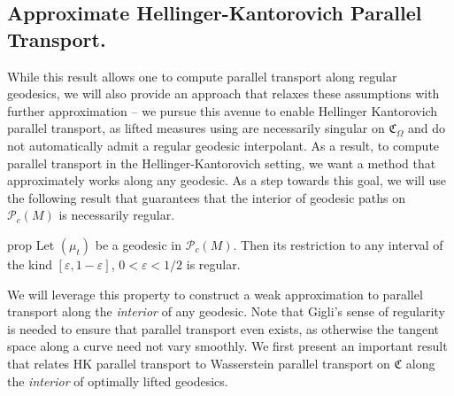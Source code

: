 \documentclass[11pt]{article}
\newcommand{\man}{M}
\begin{document}
\subsection{Approximate Hellinger-Kantorovich Parallel Transport.} 
While this result allows one to compute parallel transport along regular geodesics, we will also provide an approach that relaxes these assumptions with further approximation -- we pursue this avenue to enable Hellinger Kantorovich parallel transport, as lifted measures using  are necessarily singular on $\mathfrak{C}_{\Omega}$ and do not automatically admit a regular geodesic interpolant. As a result, to compute parallel transport in the Hellinger-Kantorovich setting, we want a method that approximately works along any geodesic. As a step towards this goal, we will use the following result that guarantees that the interior of geodesic paths on $\mathcal{P}_c(\man)$ is necessarily regular.

\begin{restatable}{prop}{} \label{geodesic restriction}
    Let $(\mu_t)$ be a geodesic in $\mathcal{P}_c(\man)$. Then its restriction to any interval of the kind $[\varepsilon, 1-\varepsilon]$, $0 < \varepsilon< 1/2$ is regular.
\end{restatable}

We will leverage this property to construct a weak approximation to parallel transport along the \textit{interior} of any geodesic. Note that Gigli's sense of regularity is needed to ensure that parallel transport even exists, as otherwise the tangent space along a curve need not vary smoothly. We first present an important result that relates HK parallel transport to Wasserstein parallel transport on $\mathfrak{C}$ along the \textit{interior} of optimally lifted geodesics.
\end{document}
